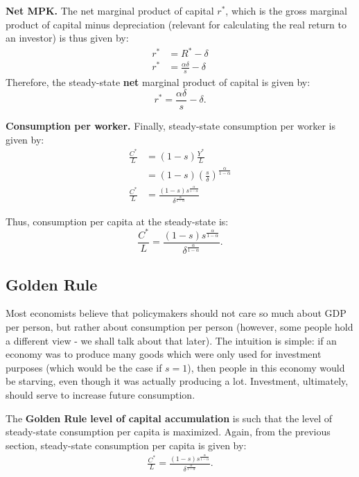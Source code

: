 \documentclass[]{book}
\begin{document}
\textbf{Net MPK.} The net marginal product of capital \(r^{*}\), which
is the gross marginal product of capital minus depreciation (relevant
for calculating the real return to an investor) is thus given by: \[
\begin{aligned}
r^{*}&=R^{*}-\delta\\
r^{*}&=\frac{\alpha \delta}{s}-\delta
\end{aligned}
\] Therefore, the steady-state \textbf{net} marginal product of capital
is given by: \[\boxed{r^{*}=\frac{\alpha \delta}{s}-\delta}.\]

\textbf{Consumption per worker.} Finally, steady-state consumption per
worker is given by: \[
\begin{aligned}
\frac{C^{*}}{L}&=(1-s)\frac{Y^{*}}{L}\\
&=(1-s)\left(\frac{s}{\delta}\right)^{\frac{\alpha}{1-\alpha}}\\
\frac{C^{*}}{L}&=\frac{(1-s)s^{\frac{\alpha}{1-\alpha}}}{\delta^{\frac{\alpha}{1-\alpha}}}
\end{aligned}
\]

Thus, consumption per capita at the steady-state is:
\[\boxed{\frac{C^{*}}{L}=\frac{(1-s)s^{\frac{\alpha}{1-\alpha}}}{\delta^{\frac{\alpha}{1-\alpha}}}}.\]

\subsection{Golden Rule}\label{golden-rule}

Most economists believe that policymakers should not care so much about
GDP per person, but rather about consumption per person (however, some
people hold a different view - we shall talk about that later). The
intuition is simple: if an economy was to produce many goods which were
only used for investment purposes (which would be the case if
\(s = 1\)), then people in this economy would be starving, even though
it was actually producing a lot. Investment, ultimately, should serve to
increase future consumption.

The \textbf{Golden Rule level of capital accumulation} is such that the
level of steady-state consumption per capita is maximized. Again, from
the previous section, steady-state consumption per capita is given by:
\[
\begin{aligned}
\frac{C^{*}}{L}=\frac{(1-s)s^{\frac{\alpha}{1-\alpha}}}{\delta^{\frac{\alpha}{1-\alpha}}}.
\end{aligned}
\]
\end{document}
